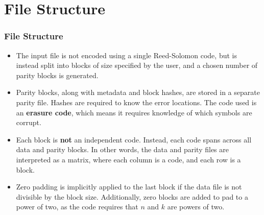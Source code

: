 \documentclass{beamer}
\begin{document}
\section{File Structure}
\begin{frame}
\frametitle{File Structure}
\begin{itemize}

\item
The input file is not encoded using a single Reed-Solomon code, but is instead split into blocks of size specified by the user, and a chosen number of parity blocks is generated.

\item
Parity blocks, along with metadata and block hashes, are stored in a separate parity file.
Hashes are required to know the error locations. The code used is an \textbf{erasure code}, which means it requires knowledge of which symbols are corrupt.

\item
Each block is \textbf{not} an independent code. Instead, each code spans across all data and parity blocks.
In other words, the data and parity files are interpreted as a matrix, where each column is a code, and each row is a block.

\item
Zero padding is implicitly applied to the last block if the data file is not divisible by the block size.
Additionally, zero blocks are added to pad to a power of two, as the code requires that $n$ and $k$ are powers of two.

\end{itemize}
\end{frame}
\end{document}
